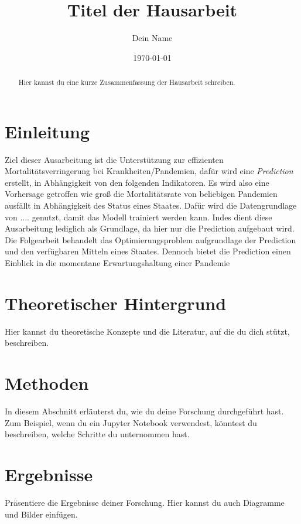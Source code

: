 \documentclass[a4paper,12pt]{article}
\title{Titel der Hausarbeit}
\author{Dein Name}
\date{\today}
\begin{document}
\maketitle

\begin{abstract}
Hier kannst du eine kurze Zusammenfassung der Hausarbeit schreiben.
\end{abstract}

\tableofcontents %

\newpage

\section{Einleitung}
Ziel dieser Ausarbeitung ist die Unterstützung zur effizienten Mortalitätsverringerung bei Krankheiten/Pandemien, dafür
wird eine \textit{Prediction} erstellt, in Abhängigkeit von den folgenden Indikatoren.\newline
Es wird also eine Vorhersage getroffen wie groß die Mortalitätsrate von beliebigen Pandemien ausfällt in Abhängigkeit des
Status eines Staates. Dafür wird die Datengrundlage von .... genutzt, damit das Modell trainiert werden kann.
Indes dient diese Ausarbeitung lediglich als Grundlage, da hier nur die Prediction aufgebaut wird. Die Folgearbeit
behandelt das Optimierungsproblem aufgrundlage der Prediction und den verfügbaren Mitteln eines Staates.\newline
Dennoch bietet die Prediction einen Einblick in die momentane Erwartungshaltung einer Pandemie

\section{Theoretischer Hintergrund}
Hier kannst du theoretische Konzepte und die Literatur, auf die du dich stützt, beschreiben.

\section{Methoden}
In diesem Abschnitt erläuterst du, wie du deine Forschung durchgeführt hast. Zum Beispiel, wenn du ein Jupyter Notebook verwendest, könntest du beschreiben, welche Schritte du unternommen hast.

\section{Ergebnisse}
Präsentiere die Ergebnisse deiner Forschung. Hier kannst du auch Diagramme und Bilder einfügen.
\end{document}
